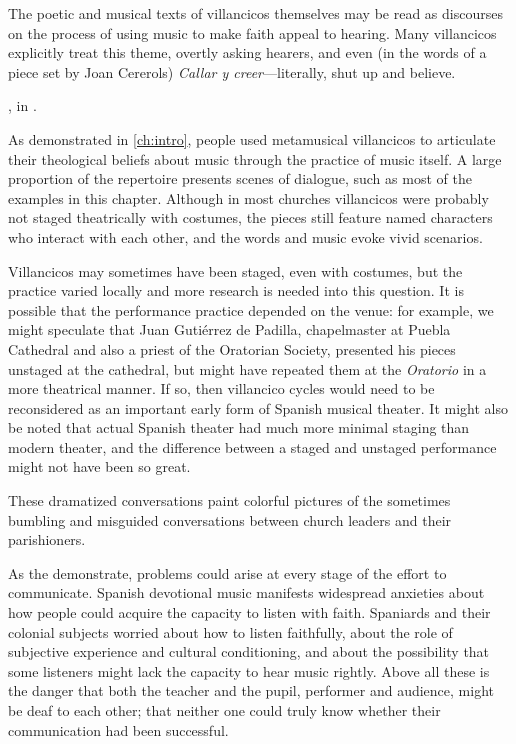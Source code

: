 The poetic and musical texts of villancicos themselves may be read as discourses
on the process of using music to make faith appeal to hearing.
Many villancicos explicitly treat this theme, overtly asking hearers,
  and even (in the words of a piece set
by Joan Cererols) \emph{Callar y creer}---literally, shut up and believe.%
    \begin{Footnote}
        , in
        \autocite[205--212]{Cererols:MEM-VC}.
    \end{Footnote}
As demonstrated in \cref{ch:intro}, people used metamusical villancicos to
articulate their theological beliefs about music through the practice of music
itself.
A large proportion of the repertoire presents scenes of dialogue, such as most
of the examples in this chapter.
Although in most churches villancicos were probably not staged theatrically with
costumes, the pieces still feature named characters who interact with each
other, and the words and music evoke vivid scenarios.%
\begin{Footnote}
    Villancicos may sometimes have been staged, even with costumes, but the
    practice varied locally and more research is needed into this question.
    It is possible that the performance practice depended on the venue: for
    example, we might speculate that Juan Gutiérrez de Padilla, chapelmaster at
    Puebla Cathedral and also a priest of the Oratorian Society, presented his
    pieces unstaged at the cathedral, but might have repeated them at the
    \emph{Oratorio} in a more theatrical manner.
    If so, then villancico cycles would need to be reconsidered as an important
    early form of Spanish musical theater.
    It might also be noted that actual Spanish theater had much more minimal
    staging than modern theater, and the difference between a staged and
    unstaged performance might not have been so great.
\end{Footnote}
These dramatized conversations paint colorful pictures of the sometimes bumbling
and misguided conversations between church leaders and their parishioners.

As the  demonstrate, problems could arise at
every stage of the effort to communicate.
Spanish devotional music manifests widespread anxieties about how people could
acquire the capacity to listen with faith.
Spaniards and their colonial subjects worried about how to listen faithfully,
about the role of subjective experience and cultural conditioning, and about the
possibility that some listeners might lack the capacity to hear music rightly.
Above all these is the danger that both the teacher and the pupil, performer and
audience, might be deaf to each other; that neither one could truly know whether
their communication had been successful.

